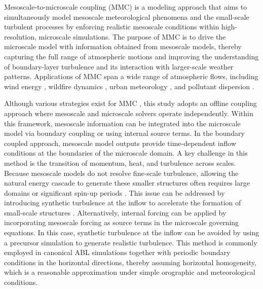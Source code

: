 Mesoscale-to-microscale coupling (MMC) is a modeling approach that aims to simultaneously model mesoscale meteorological phenomena and the small-scale turbulent processes by enforcing realistic mesoscale conditions within high-resolution, microscale simulations. The purpose of MMC is to drive the microscale model with information obtained from mesoscale models, thereby capturing the full range of atmospheric motions and improving the understanding of boundary-layer turbulence and its interaction with larger-scale weather patterns. Applications of MMC span a wide range of atmospheric flows, including wind energy \citep{sanz2017mesoscale, sanz2017methodology, quon2024measurement}, wildfire dynamics \citep{nakayama2015large}, urban meteorology \citep{baklanov2009multi, liu2012study}, and pollutant dispersion \citep{nakayama2015large}.

Although various strategies exist for MMC \citep{haupt2023lessons}, this study adopts an offline coupling approach where mesoscale and microscale solvers operate independently. Within this framework, mesoscale information can be integrated into the microscale model via boundary coupling or using internal source terms. In the boundary coupled approach, mesoscale model outputs provide time-dependent inflow conditions at the boundaries of the microscale domain. A key challenge in this method is the transition of momentum, heat, and turbulence across scales. Because mesoscale models do not resolve fine-scale turbulence, allowing the natural energy cascade to generate these smaller structures often requires large domains or significant spin-up periods \citep{meneveau2019big}. This issue can be addressed by introducing synthetic turbulence at the inflow to accelerate the formation of small-scale structures \citep{mirocha2014resolved, munoz2015stochastic,munoz2018generation,quon2018enrichment}. Alternatively, internal forcing can be applied by incorporating mesoscale forcing as source terms in the microscale governing equations. In this case, synthetic turbulence at the inflow can be avoided by using a precursor simulation \citep{stevens2014concurrent, stipa2023tosca} to generate realistic turbulence. This method is commonly employed in canonical ABL simulations together with periodic boundary conditions in the horizontal directions, thereby assuming horizontal homogeneity, which is a reasonable approximation under simple orographic and meteorological conditions.

